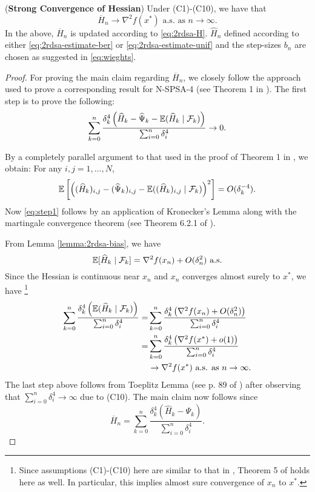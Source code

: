 \begin{theorem}(\textbf{Strong Convergence of Hessian})
\label{thm:2rdsa-H}
Under (C1)-(C10), we have that 
$$\overline H_n \rightarrow \nabla^2 f(x^*) \text{ a.s. as } n\rightarrow \infty.$$ 
In the above, $\overline H_n$ is updated according to \eqref{eq:2rdsa-H}. $\widehat H_n$ defined according to either \eqref{eq:2rdsa-estimate-ber} or \eqref{eq:2rdsa-estimate-unif} and the step-sizes $b_n$ are chosen as suggested in \eqref{eq:wieghts}. 
\end{theorem}
\begin{proof}
For proving the main claim regarding $\overline H_n$, we closely follow the approach used to prove a corresponding result for N-SPSA-4 (see Theorem 1 in \cite{spall-jacobian}). 
The first step is to prove the following:
\begin{align}
\sum_{k=0}^n \dfrac{\delta_k^4 \left(\widehat H_k - \widehat \Psi_k - \E(\widehat H_k \mid \F_k)\right)}{\sum_{i=0}^n \delta_i^4} \rightarrow 0.
\label{eq:step1}
\end{align}

By a completely parallel argument to that used in the proof of Theorem 1 in \cite{spall-jacobian}, we obtain: For any $i,j = 1,\ldots,N$,
\begin{align*}
\mathbb{E} \left[\left((\widehat {H}_k)_{i,j} - (\widehat {\Psi}_k)_{i,j} - \mathbb{E}((\widehat {H}_k)_{i,j} \mid \mathcal{F}_k)\right)^2\right] = O(\delta_k^{-4}).
\end{align*}
Now \eqref{eq:step1} follows by an application of Kronecker's Lemma along with the martingale convergence theorem (see Theorem 6.2.1 of \cite{lahaprobability}).

From Lemma \ref{lemma:2rdsa-bias}, we have 
$$ \mathbb{E}[ \widehat H_k \mid \mathcal{F}_k] = \nabla^2 f(x_n) + O(\delta_n^2) \text{ a.s.}$$
Since the Hessian is continuous near $x_n$ and $x_n$ converges almost surely to $x^*$, we have
\footnote{Since assumptions (C1)-(C10) here are similar to that in \cite{prashanth2015rdsa}, Theorem 5 of \cite{prashanth2015rdsa} holds here as well. In particular, this implies almost sure convergence of $x_n$ to $x^*$.}
\begin{align*}
\sum_{k=0}^n \dfrac{\delta_k^4 \left(\mathbb{E}(\widehat H_k \mid \mathcal{F}_k)\right)}{\sum_{i=0}^n \delta_i^4} 
=&\sum_{k=0}^n \dfrac{\delta_k^4 \left(\nabla^2 f(x_n) + O(\delta_n^2)\right)}{\sum_{i=0}^n \delta_i^4}\\
=&\sum_{k=0}^n \dfrac{\delta_k^4 \left(\nabla^2 f(x^*) + o(1)\right)}{\sum_{i=0}^n \delta_i^4}\\
&\rightarrow \nabla^2 f(x^*) \text{ a.s. as } n \rightarrow \infty.
\end{align*}
The last step above follows from Toeplitz Lemma (see p. 89 of \cite{lahaprobability}) after observing that $\sum_{i=0}^n \delta_i^4 \rightarrow \infty$ due to (C10). 
The main claim now follows since 
$$ \overline H_n = \sum_{k=0}^n \dfrac{\delta_k^4 \left(\widehat H_k - \Psi_k \right)}{\sum_{i=0}^n \delta_i^4}.$$
\end{proof}


